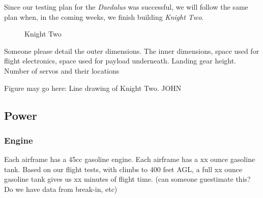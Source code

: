 \documentclass[10pt]{report}
\begin{document}
Since our testing plan for the \emph{Daedalus} was successful, we will follow the same plan when, in the coming weeks, we finish building \emph{Knight Two}.

\begin{figure}
	\centering
  	\label{fig:knighttwo}
  	\caption[Knight Two]{Knight Two}
\end{figure}
Someone please detail the outer dimensions. The inner dimensions, space used for flight electronics, space used for payload underneath. Landing gear height. Number of servos and their locations

Figure may go here: Line drawing of Knight Two. JOHN

\subsection{Power}

\subsubsection{Engine}

Each airframe has a 45cc gasoline engine. Each airframe has a xx ounce gasoline tank. Based on our flight tests, with climbs to 400 feet AGL, a full xx ounce gasoline tank gives us xx minutes of flight time. (can someone guestimate this? Do we have data from break-in, etc)
\end{document}
